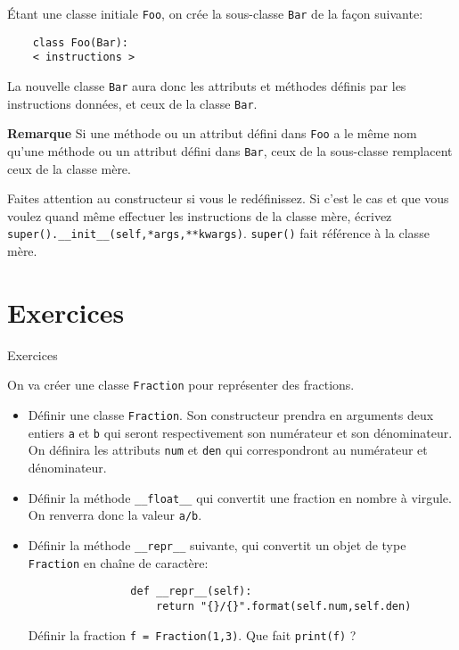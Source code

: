 \begin{frame}[fragile]
	Étant une classe initiale \lstinline|Foo|, on crée la sous-classe \lstinline|Bar| de la façon suivante:
	\begin{lstlisting}
	class Foo(Bar):
	< instructions >
	\end{lstlisting}
	
	La nouvelle classe \lstinline|Bar| aura donc les attributs et méthodes définis par les instructions données, et ceux de la classe \lstinline|Bar|.\pause
	
	\textbf{Remarque} Si une méthode ou un attribut défini dans \lstinline|Foo| a le même nom qu'une méthode ou un attribut défini dans \lstinline|Bar|, ceux de la sous-classe remplacent ceux de la classe mère.\pause
	
	Faites attention au constructeur si vous le redéfinissez. Si c'est le cas et que vous voulez quand même effectuer les instructions de la classe mère, écrivez \lstinline|super().__init__(self,*args,**kwargs)|. \lstinline|super()| fait référence à la classe mère.
\end{frame}

\section{Exercices}

\begin{frame}[fragile]{Exercices}
	\begin{exo}[Fractions]
		On va créer une classe \lstinline|Fraction| pour représenter des fractions.\pause
		\begin{itemize}
			\item Définir une classe \lstinline|Fraction|. Son constructeur prendra en arguments deux entiers \lstinline|a| et \lstinline|b| qui seront respectivement son numérateur et son dénominateur. On définira les attributs \lstinline|num| et \lstinline|den| qui correspondront au numérateur et dénominateur.\pause
			\item Définir la méthode \lstinline|__float__| qui convertit une fraction en nombre à virgule. On renverra donc la valeur \lstinline|a/b|.\pause
			\item Définir la méthode \lstinline|__repr__| suivante, qui convertit un objet de type \lstinline|Fraction| en chaîne de caractère:\pause
			\begin{lstlisting}
				def __repr__(self):
					return "{}/{}".format(self.num,self.den)
			\end{lstlisting}\pause
			Définir la fraction \lstinline|f = Fraction(1,3)|. Que fait \lstinline|print(f)| ?
		\end{itemize}
	\end{exo}
\end{frame}

